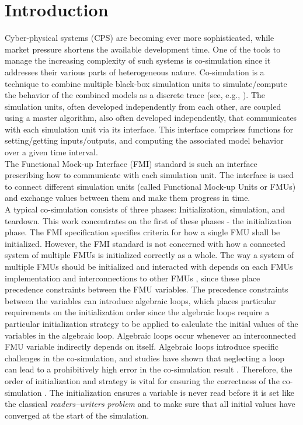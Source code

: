 \section{Introduction}\label{sc:introduction}
Cyber-physical systems (CPS) are becoming ever more sophisticated, while market pressure shortens the available development time. One of the tools to manage the increasing complexity of such systems is co-simulation since it addresses their various parts of heterogeneous nature. Co-simulation is a technique to combine multiple black-box simulation units to simulate/compute the behavior of the combined models as a discrete trace (see, e.g., \cite{Kubler2000, Gomes2018}). The simulation units, often developed independently from each other, are coupled using a master algorithm, also often developed independently, that communicates with each simulation unit via its interface. This interface comprises functions for setting/getting inputs/outputs, and computing the associated model behavior over a given time interval. \\
The Functional Mock-up Interface (FMI) standard \cite{Blochwitz2012, fmi_2019} is such an interface prescribing how to communicate with each simulation unit. The interface is used to connect different simulation units (called Functional Mock-up Units or FMUs) and exchange values between them and make them progress in time. \\

A typical co-simulation consists of three phases: Initialization, simulation, and teardown. This work concentrates on the first of these phases - the initialization phase. The FMI specification specifies criteria for how a single FMU shall be initialized. However, the FMI standard is not concerned with how a connected system of multiple FMUs is initialized correctly as a whole. 
The way a system of multiple FMUs should be initialized and interacted with depends on each FMUs implementation and interconnections to other FMUs \cite{gomes_lucio_vangheluwe_2019}, since these place precedence constraints between the FMU variables. The precedence constraints between the variables can introduce algebraic loops, which places particular requirements on the initialization order since the algebraic loops require a particular initialization strategy to be applied to calculate the initial values of the variables in the algebraic loop\cite{Bastian2011a}. Algebraic loops occur whenever an interconnected FMU variable indirectly depends on itself. Algebraic loops introduce specific challenges in the co-simulation, and studies have shown that neglecting a loop can lead to a prohibitively high error in the co-simulation result \cite{Arnold2014}. Therefore, the order of initialization and strategy is vital for ensuring the correctness of the co-simulation \cite{Thule2018}. The initialization ensures a variable is never read before it is set like the classical \textit{readers–writers problem} and to make sure that all initial values have converged at the start of the simulation. 

